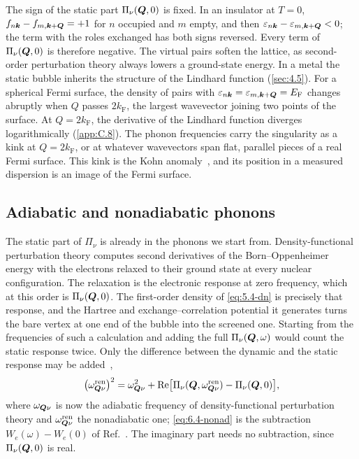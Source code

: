 The sign of the static part $\Pi_\nu(\bm{Q},0)$ is fixed. In an insulator at $T = 0$, $f_{n\bm{k}} - f_{m,\bm{k}+\bm{Q}} = +1$ for $n$ occupied and $m$ empty, and then $\varepsilon_{n\bm{k}} - \varepsilon_{m,\bm{k}+\bm{Q}} < 0$; the term with the roles exchanged has both signs reversed. Every term of $\Pi_\nu(\bm{Q},0)$ is therefore negative. The virtual pairs soften the lattice, as second-order perturbation theory always lowers a ground-state energy. In a metal the static bubble inherits the structure of the Lindhard function (\cref{sec:4.5}). For a spherical Fermi surface, the density of pairs with $\varepsilon_{n\bm{k}} = \varepsilon_{m,\bm{k}+\bm{Q}} = E_{\mathrm{F}}$ changes abruptly when $Q$ passes $2k_{\mathrm{F}}$, the largest wavevector joining two points of the surface. At $Q = 2k_{\mathrm{F}}$, the derivative of the Lindhard function diverges logarithmically (\cref{app:C.8}). The phonon frequencies carry the singularity as a kink at $Q = 2k_{\mathrm{F}}$, or at whatever wavevectors span flat, parallel pieces of a real Fermi surface. This kink is the Kohn anomaly~\cite{kohn1959image}, and its position in a measured dispersion is an image of the Fermi surface.

\subsection{Adiabatic and nonadiabatic phonons}

The static part of $\Pi_\nu$ is already in the phonons we start from. Density-functional perturbation theory computes second derivatives of the Born--Oppenheimer energy with the electrons relaxed to their ground state at every nuclear configuration. The relaxation is the electronic response at zero frequency, which at this order is $\Pi_\nu(\bm{Q},0)$. The first-order density of \cref{eq:5.4-dn} is precisely that response, and the Hartree and exchange--correlation potential it generates turns the bare vertex at one end of the bubble into the screened one. Starting from the frequencies of such a calculation and adding the full $\Pi_\nu(\bm{Q},\omega)$ would count the static response twice. Only the difference between the dynamic and the static response may be added~\cite[Eqs.~(22) and~(23)]{calandra2010adiabatic},
\begin{equation}
  \bigl(\omega^{\mathrm{ren}}_{\bm{Q}\nu}\bigr)^2 = \omega_{\bm{Q}\nu}^2 + \operatorname{Re}\bigl[\Pi_\nu(\bm{Q},\omega^{\mathrm{ren}}_{\bm{Q}\nu}) - \Pi_\nu(\bm{Q},0)\bigr] ,
  \label{eq:6.4-nonad}
\end{equation}
where $\omega_{\bm{Q}\nu}$ is now the adiabatic frequency of density-functional perturbation theory and $\omega^{\mathrm{ren}}_{\bm{Q}\nu}$ the nonadiabatic one; \cref{eq:6.4-nonad} is the subtraction $W_e(\omega) - W_e(0)$ of Ref.~\cite[Eq.~(140)]{giustino2017electron}. The imaginary part needs no subtraction, since $\Pi_\nu(\bm{Q},0)$ is real.

